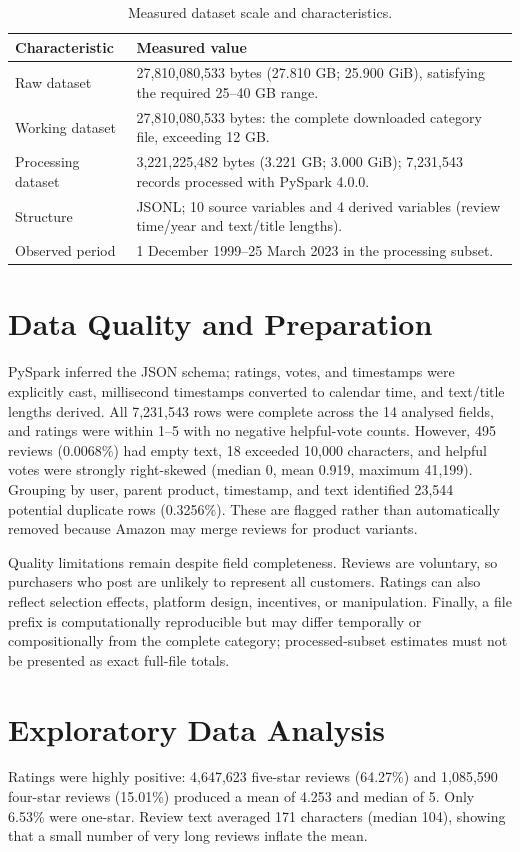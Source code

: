 \documentclass[10pt,a4paper]{article}
\begin{document}
\begin{table}[H]
\centering\footnotesize
\caption{Measured dataset scale and characteristics.}
\begin{tabularx}{\textwidth}{@{}p{2.8cm}Y@{}}
\toprule
\textbf{Characteristic} & \textbf{Measured value} \\
\midrule
Raw dataset & 27,810,080,533 bytes (27.810 GB; 25.900 GiB), satisfying the required 25--40 GB range. \\
Working dataset & 27,810,080,533 bytes: the complete downloaded category file, exceeding 12 GB. \\
Processing dataset & 3,221,225,482 bytes (3.221 GB; 3.000 GiB); 7,231,543 records processed with PySpark 4.0.0. \\
Structure & JSONL; 10 source variables and 4 derived variables (review time/year and text/title lengths). \\
Observed period & 1 December 1999--25 March 2023 in the processing subset. \\
\bottomrule
\end{tabularx}
\end{table}

\section{Data Quality and Preparation}
PySpark inferred the JSON schema; ratings, votes, and timestamps were explicitly cast, millisecond timestamps converted to calendar time, and text/title lengths derived. All 7,231,543 rows were complete across the 14 analysed fields, and ratings were within 1--5 with no negative helpful-vote counts. However, 495 reviews (0.0068\%) had empty text, 18 exceeded 10,000 characters, and helpful votes were strongly right-skewed (median 0, mean 0.919, maximum 41,199). Grouping by user, parent product, timestamp, and text identified 23,544 potential duplicate rows (0.3256\%). These are flagged rather than automatically removed because Amazon may merge reviews for product variants.

Quality limitations remain despite field completeness. Reviews are voluntary, so purchasers who post are unlikely to represent all customers. Ratings can also reflect selection effects, platform design, incentives, or manipulation. Finally, a file prefix is computationally reproducible but may differ temporally or compositionally from the complete category; processed-subset estimates must not be presented as exact full-file totals.

\section{Exploratory Data Analysis}
Ratings were highly positive: 4,647,623 five-star reviews (64.27\%) and 1,085,590 four-star reviews (15.01\%) produced a mean of 4.253 and median of 5. Only 6.53\% were one-star. Review text averaged 171 characters (median 104), showing that a small number of very long reviews inflate the mean.
\end{document}
